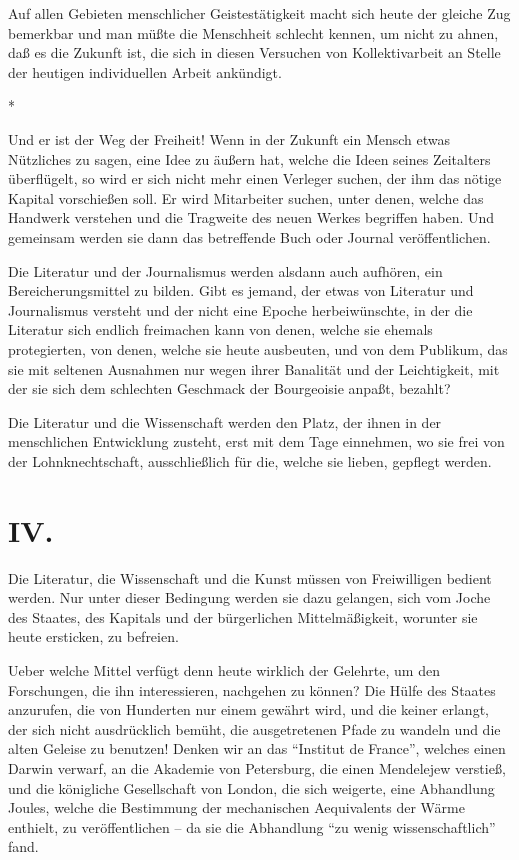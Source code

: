 \documentclass{scrbook}
\begin{document}
Auf allen Gebieten menschlicher Geistestätigkeit macht sich heute der gleiche Zug bemerkbar und man müßte die Menschheit schlecht kennen, um nicht zu ahnen, daß es die Zukunft ist, die sich in diesen Versuchen von Kollektivarbeit an Stelle der heutigen individuellen Arbeit ankündigt.

\begin{center}*\end{center}

Und er ist der Weg der Freiheit! Wenn in der Zukunft ein Mensch etwas Nützliches zu sagen, eine Idee zu äußern hat, welche die Ideen seines Zeitalters überflügelt, so wird er sich nicht mehr einen Verleger suchen, der ihm das nötige Kapital vorschießen soll. Er wird Mitarbeiter suchen, unter denen, welche das Handwerk verstehen und die Tragweite des neuen Werkes begriffen haben. Und gemeinsam werden sie dann das betreffende Buch oder Journal veröffentlichen.

Die Literatur und der Journalismus werden alsdann auch aufhören, ein Bereicherungsmittel zu bilden. Gibt es jemand, der etwas von Literatur und Journalismus versteht und der nicht eine Epoche herbeiwünschte, in der die Literatur sich endlich freimachen kann von denen, welche sie ehemals protegierten, von denen, welche sie heute ausbeuten, und von dem Publikum, das sie mit seltenen Ausnahmen nur wegen ihrer Banalität und der Leichtigkeit, mit der sie sich dem schlechten Geschmack der Bourgeoisie anpaßt, bezahlt?

Die Literatur und die Wissenschaft werden den Platz, der ihnen in der menschlichen Entwicklung zusteht, erst mit dem Tage einnehmen, wo sie frei von der Lohnknechtschaft, ausschließlich für die, welche sie lieben, gepflegt werden.

\section*{IV.}

Die Literatur, die Wissenschaft und die Kunst müssen von Freiwilligen bedient werden. Nur unter dieser Bedingung werden sie dazu gelangen, sich vom Joche des Staates, des Kapitals und der bürgerlichen Mittelmäßigkeit, worunter sie heute ersticken, zu befreien.

Ueber welche Mittel verfügt denn heute wirklich der Gelehrte, um den Forschungen, die ihn interessieren, nachgehen zu können? Die Hülfe des Staates anzurufen, die von Hunderten nur einem gewährt wird, und die keiner erlangt, der sich nicht ausdrücklich bemüht, die ausgetretenen Pfade zu wandeln und die alten Geleise zu benutzen! Denken wir an das ``Institut de France'', welches einen Darwin verwarf, an die Akademie von Petersburg, die einen Mendelejew verstieß, und die königliche Gesellschaft von London, die sich weigerte, eine Abhandlung Joules, welche die Bestimmung der mechanischen Aequivalents der Wärme enthielt, zu veröffentlichen – da sie die Abhandlung ``zu wenig wissenschaftlich'' fand.
\end{document}

